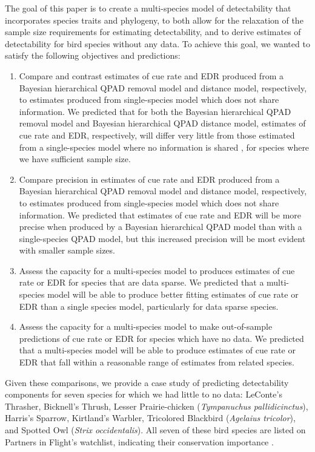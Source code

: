 \documentclass[12pt]{article}
\begin{document}
\par The goal of this paper is to create a multi-species model of detectability that incorporates species traits and phylogeny, to both allow for the relaxation of the sample size requirements for estimating detectability, and to derive estimates of detectability for bird species without any data.
To achieve this goal, we wanted to satisfy the following objectives and predictions:
\begin{enumerate}
	\item Compare and contrast estimates of cue rate and EDR produced from a Bayesian hierarchical QPAD removal model and distance model, respectively, to estimates produced from single-species model which does not share information. 
	We predicted that for both the Bayesian hierarchical QPAD removal model and Bayesian hierarchical QPAD distance model, estimates of cue rate and EDR, respectively, will differ very little from those estimated from a single-species model where no information is shared \cite{edwards_point_2023}, for species where we have sufficient sample size.
	\item Compare precision in estimates of cue rate and EDR produced from a Bayesian hierarchical QPAD removal model and distance model, respectively, to estimates produced from single-species model which does not share information. 
	We predicted that estimates of cue rate and EDR will be more precise when produced by a Bayesian hierarchical QPAD model than with a single-species QPAD model, but this increased precision will be most evident with smaller sample sizes.
	\item Assess the capacity for a multi-species model to produces estimates of cue rate or EDR for species that are data sparse.
	We predicted that a multi-species model will be able to produce better fitting estimates of cue rate or EDR than a single species model, particularly for data sparse species.
	\item Assess the capacity for a multi-species model to make out-of-sample predictions of cue rate or EDR for species which have no data.
	We predicted that a multi-species model will be able to produce estimates of cue rate or EDR that fall within a reasonable range of estimates from related species.
\end{enumerate}

Given these comparisons, we provide a case study of predicting detectability components for seven species for which we had little to no data: LeConte's Thrasher, Bicknell's Thrush, Lesser Prairie-chicken (\textit{Tympanuchus pallidicinctus}), Harris's Sparrow, Kirtland's Warbler, Tricolored Blackbird (\textit{Agelaius tricolor}), and Spotted Owl (\textit{Strix occidentalis}). 	
All seven of these bird species are listed on Partners in Flight’s watchlist, indicating their conservation importance \citep{will_handbook_2020}. 	
\end{document}
